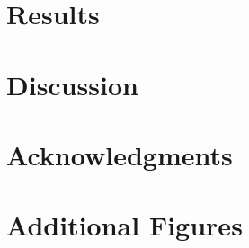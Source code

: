 \documentclass[aip,cha,reprint,superscriptaddress,floatfix,nofootinbib]{revtex4-1}
\begin{document}
\section{Results}
\label{sec:results}


\section{Discussion}
\label{sec:conclusion}




\appendix

\section{Acknowledgments}
\label{sec:acknowledgements}


\section{Additional Figures}
\label{sec:figures}

\end{document}
